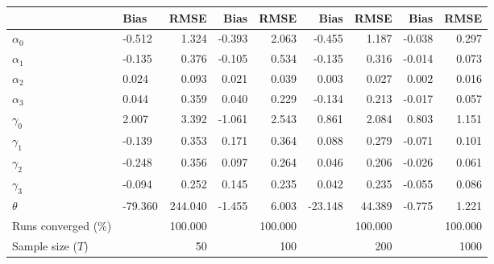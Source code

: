 
\begin{tabular}[t]{llrrrrrrr}
\toprule
  & Bias & RMSE & Bias & RMSE & Bias & RMSE & Bias & RMSE\\
\midrule
$\alpha_{0}$ & -0.512 & 1.324 & -0.393 & 2.063 & -0.455 & 1.187 & -0.038 & 0.297\\
$\alpha_{1}$ & -0.135 & 0.376 & -0.105 & 0.534 & -0.135 & 0.316 & -0.014 & 0.073\\
$\alpha_{2}$ & 0.024 & 0.093 & 0.021 & 0.039 & 0.003 & 0.027 & 0.002 & 0.016\\
$\alpha_{3}$ & 0.044 & 0.359 & 0.040 & 0.229 & -0.134 & 0.213 & -0.017 & 0.057\\
$\gamma_{0}$ & 2.007 & 3.392 & -1.061 & 2.543 & 0.861 & 2.084 & 0.803 & 1.151\\
$\gamma_{1}$ & -0.139 & 0.353 & 0.171 & 0.364 & 0.088 & 0.279 & -0.071 & 0.101\\
$\gamma_{2}$ & -0.248 & 0.356 & 0.097 & 0.264 & 0.046 & 0.206 & -0.026 & 0.061\\
$\gamma_{3}$ & -0.094 & 0.252 & 0.145 & 0.235 & 0.042 & 0.235 & -0.055 & 0.086\\
$\theta$ & -79.360 & 244.040 & -1.455 & 6.003 & -23.148 & 44.389 & -0.775 & 1.221\\
Runs converged (\%) &  & 100.000 &  & 100.000 &  & 100.000 &  & 100.000\\
Sample size ($T$) &  & 50 &  & 100 &  & 200 &  & 1000\\
\bottomrule
\end{tabular}
